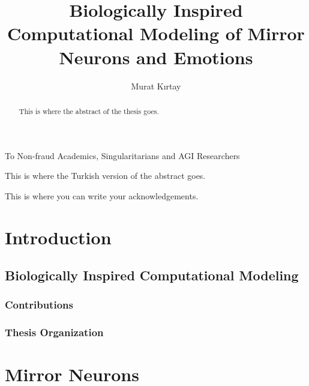 \documentclass[a4,12pt]{ozu-thesis}
\title{Biologically Inspired Computational Modeling of Mirror Neurons and Emotions} %
\author{Murat K{\i}rtay}
\begin{document}


\begin{preliminary}

\begin{dedication}
\null\vfil
{\large
\begin{center}
To Non-fraud Academics, Singularitarians and AGI Researchers


\end{center}}
\vfil\null
\end{dedication}

\begin{abstract}
This is where the abstract of the thesis goes.
\end{abstract}

\begin{ozetce}
This is where the Turkish version of the abstract goes.
\end{ozetce}

\begin{acknowledgements}

This is where you can write your acknowledgements.
\end{acknowledgements}


\contents
%

\end{preliminary}

\chapter{Introduction}



\section{Biologically Inspired Computational Modeling}
\subsection{Contributions}
\subsection{Thesis Organization}

\chapter{Mirror Neurons}
\end{document}
